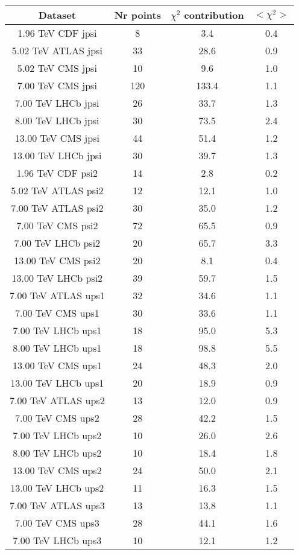 \begin{table}[h!]
\centering
\begin{tabular}{c|c|c|c}
Dataset & Nr points & $\chi^2$ contribution & $<\chi^2>$ \\
\hline
1.96 TeV CDF jpsi & 8 & 3.4 & 0.4 \\
5.02 TeV ATLAS jpsi & 33 & 28.6 & 0.9 \\
5.02 TeV CMS jpsi & 10 & 9.6 & 1.0 \\
7.00 TeV CMS jpsi & 120 & 133.4 & 1.1 \\
7.00 TeV LHCb jpsi & 26 & 33.7 & 1.3 \\
8.00 TeV LHCb jpsi & 30 & 73.5 & 2.4 \\
13.00 TeV CMS jpsi & 44 & 51.4 & 1.2 \\
13.00 TeV LHCb jpsi & 30 & 39.7 & 1.3 \\
1.96 TeV CDF psi2 & 14 & 2.8 & 0.2 \\
5.02 TeV ATLAS psi2 & 12 & 12.1 & 1.0 \\
7.00 TeV ATLAS psi2 & 30 & 35.0 & 1.2 \\
7.00 TeV CMS psi2 & 72 & 65.5 & 0.9 \\
7.00 TeV LHCb psi2 & 20 & 65.7 & 3.3 \\
13.00 TeV CMS psi2 & 20 & 8.1 & 0.4 \\
13.00 TeV LHCb psi2 & 39 & 59.7 & 1.5 \\
7.00 TeV ATLAS ups1 & 32 & 34.6 & 1.1 \\
7.00 TeV CMS ups1 & 30 & 33.6 & 1.1 \\
7.00 TeV LHCb ups1 & 18 & 95.0 & 5.3 \\
8.00 TeV LHCb ups1 & 18 & 98.8 & 5.5 \\
13.00 TeV CMS ups1 & 24 & 48.3 & 2.0 \\
13.00 TeV LHCb ups1 & 20 & 18.9 & 0.9 \\
7.00 TeV ATLAS ups2 & 13 & 12.0 & 0.9 \\
7.00 TeV CMS ups2 & 28 & 42.2 & 1.5 \\
7.00 TeV LHCb ups2 & 10 & 26.0 & 2.6 \\
8.00 TeV LHCb ups2 & 10 & 18.4 & 1.8 \\
13.00 TeV CMS ups2 & 24 & 50.0 & 2.1 \\
13.00 TeV LHCb ups2 & 11 & 16.3 & 1.5 \\
7.00 TeV ATLAS ups3 & 13 & 13.8 & 1.1 \\
7.00 TeV CMS ups3 & 28 & 44.1 & 1.6 \\
7.00 TeV LHCb ups3 & 10 & 12.1 & 1.2 \\

\end{tabular}
\end{table}

